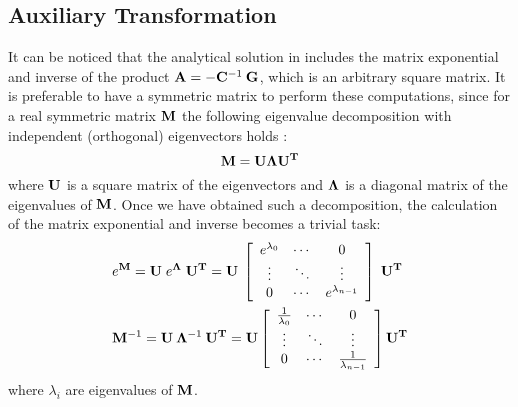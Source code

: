 \subsection{Auxiliary Transformation} \label{sec:ce-auxiliary}
It can be noticed that the analytical solution in  includes the matrix exponential and inverse of the product \mbox{$\mathbf{A} = - \mathbf{C}^{-1} \: \mathbf{G}$}, which is an arbitrary square matrix. It is preferable to have a symmetric matrix to perform these computations, since for a real symmetric matrix $\mathbf{M}$ the following eigenvalue decomposition with independent (orthogonal) eigenvectors holds \cite{press2007}:
\begin{equation} \label{eq:eigenvalue-decomposition}
  \mathbf{M} = \mathbf{U} \mathbf{\Lambda} \mathbf{U}^{\mathbf{T}}
\end{equation}
where $\mathbf{U}$ is a square matrix of the eigenvectors and $\mathbf{\Lambda}$ is a diagonal matrix of the eigenvalues of $\mathbf{M}$. Once we have obtained such a decomposition, the calculation of the matrix exponential and inverse becomes a trivial task:
\begin{align*}
  & e^{\mathbf{M}} = \mathbf{U} \; e^{\mathbf{\Lambda}} \; \mathbf{U}^{\mathbf{T}} = \mathbf{U}\: \left[
      \begin{array}{ccc}
        e^{\lambda_0} & \cdots & 0 \\
        \vdots & \ddots & \vdots \\
        0 & \cdots & e^{\lambda_{n - 1}}
      \end{array}
    \right] \; \mathbf{U}^{\mathbf{T}} \\
  & \mathbf{M}^{-1} = \mathbf{U} \: \mathbf{\Lambda}^{-1} \: \mathbf{U}^{\mathbf{T}} = \mathbf{U} \left[
      \begin{array}{ccc}
        \frac{1}{\lambda_0} & \cdots & 0 \\
        \vdots & \ddots & \vdots \\
        0 & \cdots & \frac{1}{\lambda_{n - 1}}
      \end{array}
    \right] \mathbf{U}^{\mathbf{T}} \\
\end{align*}
where $\lambda_i$ are eigenvalues of $\mathbf{M}$.

